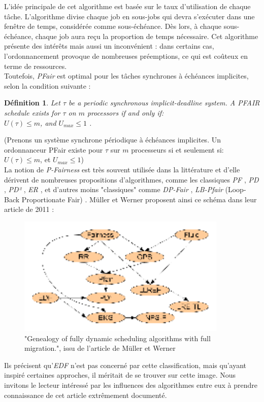 \documentclass[11pt,a4paper,oneside]{report}
\newtheorem{mydef}{Définition}
\begin{document}
L'idée principale de cet algorithme est basée sur le taux d'utilisation de chaque tâche. 
L'algorithme divise chaque job en sous-jobs qui devra s'exécuter dans une fenêtre de temps, 
considérée comme sous-échéance. Dès lors, à chaque sous-échéance, 
chaque job aura reçu la proportion de temps nécessaire. 
Cet algorithme présente des intérêts mais aussi un inconvénient : dans certains cas, 
l'ordonnancement provoque de nombreuses préemptions, ce qui est coûteux en terme de ressources.\\

Toutefois, \textit{PFair} est optimal pour les tâches synchrones à échéances implicites, selon 
la condition suivante :\\
\begin{mydef}
	Let $\tau$ be a periodic synchronous implicit-deadline system.
	A PFAIR schedule exists for $\tau$ on $m$ processors if and only if:\\
	$U(\tau) \leq m$, and $U_{max} \leq 1$ \cite{baruah_proportionate_1996}.
\end{mydef}
(Prenons un système synchrone périodique à échéances implicites. 
Un ordonnanceur PFair existe pour $\tau$ sur $m$ processeurs si et seulement si:\\
$U(\tau) \leq m$, et $U_{max} \leq 1$)\\

La notion de \textit{P-Fairness} est très souvent utilisée dans la littérature et d'elle dérivent 
de nombreuses propositions d'algorithmes, comme les classiques \textit{PF} \cite{baruah_proportionate_1996}, \textit{PD} \cite{baruah_fast_1995}, \textit{PD²} \cite{srinivasan_optimal_2006} , \textit{ER} \cite{anderson_early-release_2000}, 
et d'autres moins "classiques" comme \textit{DP-Fair} \cite{levin_dp-fair:_2010}, 
\textit{LB-Pfair} (Loop-Back Proportionate Fair) \cite{kramer_proportionate_2015}. 
Müller et Werner proposent ainsi ce schéma dans leur article de 2011 :\\
\begin{figure}[ht]
	\caption{"Genealogy of fully dynamic scheduling algorithms with full migration.", issu de l'article de Müller et Werner\cite{muller_genealogy_2011}}
	\includegraphics[width=10cm]{img/genealogy_pf}
\end{figure}
Ils précisent qu'\textit{EDF} n'est pas concerné par cette classification, mais qu'ayant 
inspiré certaines approches, il méritait de se trouver sur cette image. 
Nous invitons le lecteur intéressé par les influences des algorithmes entre eux 
à prendre connaissance de cet article extrêmement documenté.\\
\end{document}
